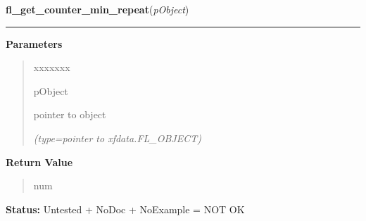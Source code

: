 \hspace{.8\funcindent}\begin{boxedminipage}{\funcwidth}

    \raggedright \textbf{fl\_get\_counter\_min\_repeat}(\textit{pObject})

    \vspace{-1.5ex}

    \rule{\textwidth}{0.5\fboxrule}
\setlength{\parskip}{2ex}
\setlength{\parskip}{1ex}
      \textbf{Parameters}
      \vspace{-1ex}

      \begin{quote}
        \begin{Ventry}{xxxxxxx}

          \item[pObject]

          pointer to object

            {\it (type=pointer to xfdata.FL\_OBJECT)}

        \end{Ventry}

      \end{quote}

      \textbf{Return Value}
    \vspace{-1ex}

      \begin{quote}
      num

      \end{quote}

\textbf{Status:} Untested + NoDoc + NoExample = NOT OK



    \end{boxedminipage}

    \label{xformslib:library:fl_set_counter_min_repeat}

    \vspace{0.5ex}

